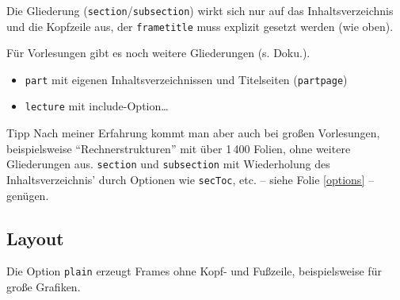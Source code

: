 \documentclass[usepdftitle=false, t]{beamer}
\begin{document}
\begin{frame}
  \frametitle{\insertsubsection}
  Die Gliederung (\texttt{section}/\texttt{subsection}) wirkt sich nur
  auf das Inhaltsverzeichnis und die Kopfzeile aus, der
  \alert{\texttt{frametitle}} muss explizit gesetzt werden (wie oben).
  \bvskip

  Für Vorlesungen gibt es noch weitere Gliederungen (s. Doku.).
  \begin{itemize}
  \item \texttt{part} mit eigenen Inhaltsverzeichnissen und Titelseiten
	(\texttt{partpage})
  \item \texttt{lecture} mit include-Option\ldots
  \end{itemize}

  \begin{block}{Tipp}
  Nach meiner Erfahrung kommt man aber auch bei großen Vorlesungen,
  beispielsweise "`Rechnerstrukturen"' mit über 1\,400 Folien,
  ohne weitere Gliederungen aus. \texttt{section} und \texttt{subsection}
  mit Wiederholung des Inhaltsverzeichnis' durch Optionen wie
  \texttt{secToc}, etc. -- siehe Folie \ref{options} -- genügen.
  \end{block}
\end{frame}

\subsection{Layout}			%

\begin{frame}[plain]
  Die Option \alert{\texttt{plain}} erzeugt Frames ohne Kopf- und Fußzeile,
  beispielsweise für große Grafiken.
\end{frame}
\end{document}
